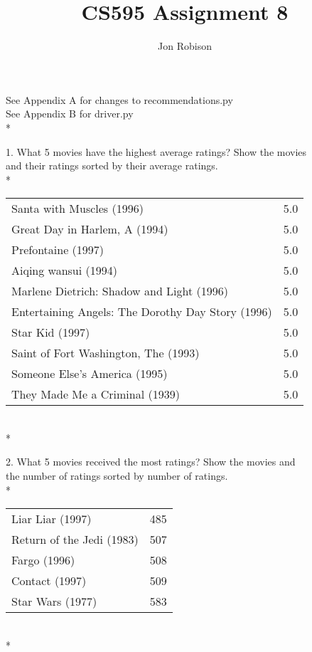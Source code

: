 \documentclass{article}
\begin{document}
\author{Jon Robison}
\title{CS595 Assignment 8}
\maketitle

See Appendix A for changes to recommendations.py\\
See Appendix B for driver.py\\*

1.  What 5 movies have the highest average ratings? Show the movies\\
and their ratings sorted by their average ratings.\\*
\begin{tabular}{ l r }
Santa with Muscles (1996)  & 5.0 \\
Great Day in Harlem, A (1994)  & 5.0 \\
Prefontaine (1997)  & 5.0 \\
Aiqing wansui (1994)  & 5.0 \\
Marlene Dietrich: Shadow and Light (1996)   & 5.0 \\
Entertaining Angels: The Dorothy Day Story (1996)  & 5.0 \\
Star Kid (1997)  & 5.0 \\
Saint of Fort Washington, The (1993)  & 5.0 \\
Someone Else's America (1995)  & 5.0 \\
They Made Me a Criminal (1939)  & 5.0 \\
\end{tabular}
\\*

2.  What 5 movies received the most ratings? Show the movies and\\
the number of ratings sorted by number of ratings.\\*
\begin{tabular}{ l r }
Liar Liar (1997)& 485 \\
Return of the Jedi (1983) & 507 \\
Fargo (1996) & 508 \\
Contact (1997) & 509 \\
Star Wars (1977) & 583 \\
\end{tabular}
\\*
\end{document}
